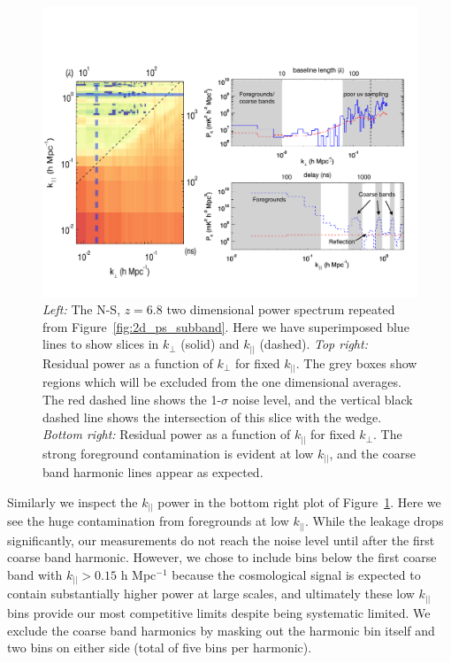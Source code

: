 \documentclass[iop]{emulateapj}
\begin{document}
\begin{figure}
\begin{center}
\includegraphics[width=\textwidth]{slices.pdf}
\caption{
\emph{Left:} The N-S, $z=6.8$ two dimensional power spectrum repeated from 
Figure~\ref{fig:2d_ps_subband}. Here we have superimposed blue lines to show slices in
$k_{\perp}$ (solid) and $k_{||}$ (dashed). \emph{Top right:} Residual power as a function
of $k_{\perp}$ for fixed $k_{||}$. The grey boxes show regions which will be excluded from
the one dimensional averages. The red dashed line shows the 1-$\sigma$ noise level, and
the vertical black dashed line shows the intersection of this slice with the wedge. 
\emph{Bottom right:} Residual power as a function of $k_{||}$ for fixed $k_{\perp}$. The strong
foreground contamination is evident at low $k_{||}$, and the coarse band harmonic lines
appear as expected. 
\label{fig:slices}
}
\end{center}
\end{figure}

Similarly we inspect the $k_{||}$ power in the bottom right plot of Figure~\ref{fig:slices}. Here
we see the huge contamination from foregrounds at low $k_{||}$. While the leakage drops 
significantly, our measurements do not reach the noise level until after the first coarse
band harmonic. However, we chose to include bins below the first coarse band with 
$k_{||}>0.15$ h Mpc$^{-1}$ because the cosmological signal is expected to contain 
substantially higher power at large scales, and ultimately these low $k_{||}$ bins provide
our most competitive limits despite being systematic limited. We exclude the coarse band
harmonics by masking out the harmonic bin itself and two bins on either side (total of five
bins per harmonic).
\end{document}
